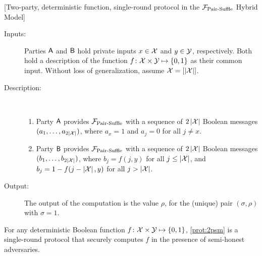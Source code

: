 \begin{protocol}\label{prot:AnyFunction} [Two-party, deterministic function, single-round protocol in the ${\cal F}_{\operatorname{Pair-Suffle}}$ Hybrid Model]\label{prot:2psm}\
\begin{description}
\item[Inputs:]  Parties $\mathsf{A}$ and $\mathsf{B}$ hold private inputs $x\in\mathcal{X}$ and $y\in\mathcal{Y}$, respectively. Both hold a description of the function $f\colon \mathcal{X}\times\mathcal{Y}\mapsto\{0,1\}$ as their common input. Without loss of generalization, assume $\mathcal{X}=[\left|\mathcal{X}\right|]$.

\item[Description:]\

\begin{enumerate}
\item Party $\mathsf{A}$ provides ${\cal F}_{\operatorname{Pair-Suffle}}$ with a sequence of  $2\left|\mathcal{X}\right|$ Boolean messages $(a_1, \ldots, a_{2\left|\mathcal{X}\right|})$, where $a_x=1$ and $a_j=0$ for all $j\neq x$.

\item Party $\mathsf{B}$ provides ${\cal F}_{\operatorname{Pair-Suffle}}$ with a sequence of $2\left|\mathcal{X}\right|$ Boolean messages $(b_1, \ldots, b_{2\left|\mathcal{X}\right|})$, where $b_j=f(j,y)$ for all $j\leq \left|\mathcal{X}\right|$, and $b_j=1-f(j-\left|\mathcal{X}\right|,y)$ for all $j> \left|\mathcal{X}\right|$. 
\end{enumerate}
\item[Output:] The output of the computation is the value $\rho$, for the (unique) pair $(\sigma,\rho)$ with $\sigma = 1$.
\end{description}
\end{protocol}

\begin{lemma}\label{lem:2psm}
For any deterministic Boolean function $f\colon \mathcal{X}\times\mathcal{Y}\mapsto\{0,1\}$, \cref{prot:2psm} is a  single-round protocol that securely computes $f$ in the presence of semi-honest adversaries. %
\end{lemma}

